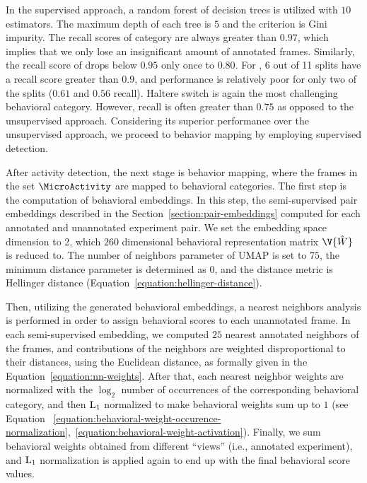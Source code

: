 In the supervised approach, a random forest of decision trees \citep{breiman_random_2001} is utilized with $10$ estimators. The maximum depth of each tree is $5$ and the criterion is Gini impurity.
The recall scores of \ProboscisPumping category are always greater than $0.97$, which implies that we only lose an insignificant amount of annotated frames.
Similarly, the recall score of \Feeding drops below $0.95$ only once to $0.80$.
For \ProboscisPumping, 6 out of 11 splits have a recall score greater than $0.9$, and performance is relatively poor for only two of the splits ($0.61$ and $0.56$ recall).
Haltere switch is again the most challenging behavioral category. However, recall is often greater than $0.75$ as opposed to the unsupervised approach.
Considering its superior performance over the unsupervised approach, we proceed to behavior mapping by employing supervised detection.

After activity detection, the next stage is behavior mapping, where the frames in the set $\MicroActivity$ are mapped to behavioral categories.
The first step is the computation of behavioral embeddings.
In this step, the semi-supervised pair embeddings described in the Section~\ref{section:pair-embeddings} computed for each annotated and unannotated experiment pair.
We set the embedding space dimension to 2, which $260$ dimensional behavioral representation matrix $\V{\hat{W}}$ is reduced to.
The number of neighbors parameter of UMAP is set to $75$, the minimum distance parameter is determined as $0$, and the distance metric is Hellinger distance (Equation~\ref{equation:hellinger-distance}).

Then, utilizing the generated behavioral embeddings, a nearest neighbors analysis is performed in order to assign behavioral scores to each unannotated frame.
In each semi-supervised embedding, we computed $25$ nearest annotated neighbors of the frames, and contributions of the neighbors are weighted disproportional to their distances, using the Euclidean distance, as formally given in the Equation~\ref{equation:nn-weights}.
After that, each nearest neighbor weights are normalized with the $\log_2$ number of occurrences of the corresponding behavioral category, and then $\textnormal{L}_1$ normalized to make behavioral weights sum up to $1$ (see Equation ~\ref{equation:behavioral-weight-occurence-normalization},~\ref{equation:behavioral-weight-activation}).
Finally, we sum behavioral weights obtained from different ``views'' (i.e., annotated experiment), and $\textnormal{L}_1$ normalization is applied again to end up with the final behavioral score values.

